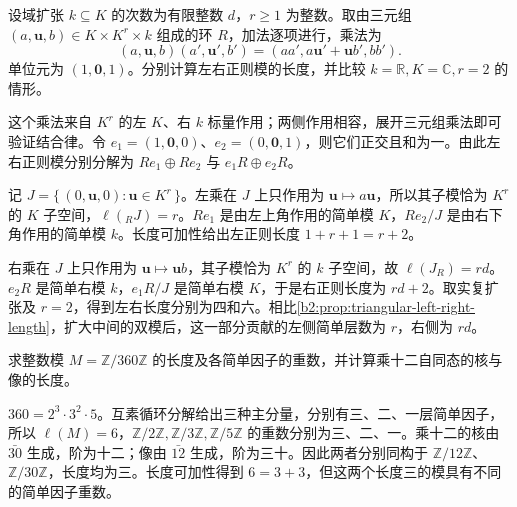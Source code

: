 \begin{exercise}\label{b2:ex:12-left-right-length}
	设域扩张 \(k\subseteq K\) 的次数为有限整数 \(d\)，\(r\ge1\) 为整数。取由三元组 \((a,\mathbf u,b)\in K\times K^r\times k\) 组成的环 \(R\)，加法逐项进行，乘法为
	\[
		(a,\mathbf u,b)(a',\mathbf u',b') =(aa',a\mathbf u'+\mathbf u b',bb').
	\]
	单位元为 \((1,\mathbf0,1)\)。分别计算左右正则模的长度，并比较 \(k=\mathbb R,K=\mathbb C,r=2\) 的情形。
\end{exercise}
\begin{solution}
	这个乘法来自 \(K^r\) 的左 \(K\)、右 \(k\) 标量作用；两侧作用相容，展开三元组乘法即可验证结合律。令 \(e_1=(1,\mathbf0,0)\)、\(e_2=(0,\mathbf0,1)\)，则它们正交且和为一。由此左右正则模分别分解为 \(Re_1\oplus Re_2\) 与 \(e_1R\oplus e_2R\)。

	记 \(J=\{\,(0,\mathbf u,0):\mathbf u\in K^r\,\}\)。左乘在 \(J\) 上只作用为 \(\mathbf u\mapsto a\mathbf u\)，所以其子模恰为 \(K^r\) 的 \(K\) 子空间，\(\ell({}_RJ)=r\)。\(Re_1\) 是由左上角作用的简单模 \(K\)，\(Re_2/J\) 是由右下角作用的简单模 \(k\)。长度可加性给出左正则长度 \(1+r+1=r+2\)。

	右乘在 \(J\) 上只作用为 \(\mathbf u\mapsto\mathbf u b\)，其子模恰为 \(K^r\) 的 \(k\) 子空间，故 \(\ell(J_R)=rd\)。\(e_2R\) 是简单右模 \(k\)，\(e_1R/J\) 是简单右模 \(K\)，于是右正则长度为 \(rd+2\)。取实复扩张及 \(r=2\)，得到左右长度分别为四和六。相比\cref{b2:prop:triangular-left-right-length}，扩大中间的双模后，这一部分贡献的左侧简单层数为 \(r\)，右侧为 \(rd\)。
\end{solution}

\begin{exercise}\label{b2:ex:12-cyclic-length}
	求整数模 \(M=\mathbb Z/360\mathbb Z\) 的长度及各简单因子的重数，并计算乘十二自同态的核与像的长度。
\end{exercise}
\begin{solution}
	\(360=2^3\cdot3^2\cdot5\)。互素循环分解给出三种主分量，分别有三、二、一层简单因子，所以 \(\ell(M)=6\)，\(\mathbb Z/2\mathbb Z,\mathbb Z/3\mathbb Z,\mathbb Z/5\mathbb Z\) 的重数分别为三、二、一。乘十二的核由 \(\bar{30}\) 生成，阶为十二；像由 \(\bar{12}\) 生成，阶为三十。因此两者分别同构于 \(\mathbb Z/12\mathbb Z\)、\(\mathbb Z/30\mathbb Z\)，长度均为三。长度可加性得到 \(6=3+3\)，但这两个长度三的模具有不同的简单因子重数。
\end{solution}

